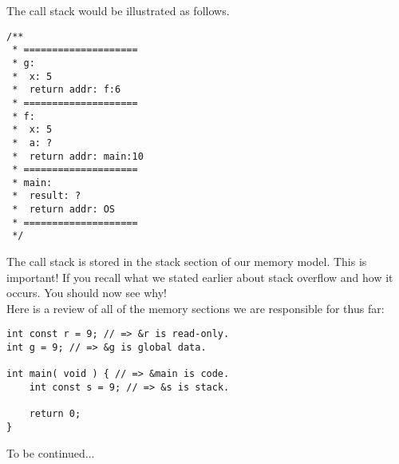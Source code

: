 The call stack would be illustrated as follows.\\

\clearpage
\lstset {
	language=c
}
\begin{lstlisting}
/**
 * ====================
 * g:
 * 	x: 5
 * 	return addr: f:6
 * ====================
 * f:
 * 	x: 5
 * 	a: ?
 * 	return addr: main:10
 * ====================
 * main:
 * 	result: ?
 * 	return addr: OS
 * ====================
 */
\end{lstlisting}

The call stack is stored in the stack section of our memory model. This is important! If you recall what we stated earlier about stack overflow and how it occurs. You should now see why!\\

Here is a review of all of the memory sections we are responsible for thus far:\\

\lstset {
	language=c
}
\begin{lstlisting}
int const r = 9; // => &r is read-only.
int g = 9; // => &g is global data.

int main( void ) { // => &main is code.
	int const s = 9; // => &s is stack.
	
	return 0;
}
\end{lstlisting}


To be continued...